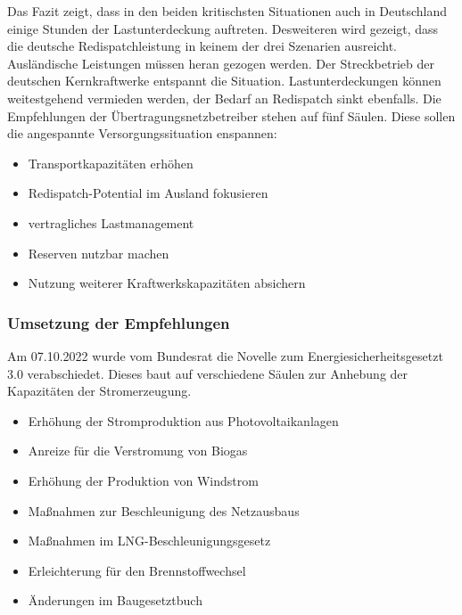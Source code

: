 		Das Fazit zeigt, dass in den beiden kritischsten Situationen auch in Deutschland einige Stunden der Lastunterdeckung auftreten. Desweiteren wird gezeigt, dass die deutsche Redispatchleistung in keinem der drei Szenarien ausreicht. Ausländische Leistungen müssen heran gezogen werden. Der Streckbetrieb der deutschen Kernkraftwerke entspannt die Situation. Lastunterdeckungen können weitestgehend vermieden werden, der Bedarf an Redispatch sinkt ebenfalls. Die Empfehlungen der Übertragungsnetzbetreiber stehen auf fünf Säulen. Diese sollen die angespannte Versorgungssituation enspannen:
			\begin{itemize}
				\item Transportkapazitäten erhöhen
				\item Redispatch-Potential im Ausland fokusieren
				\item vertragliches Lastmanagement
				\item Reserven nutzbar machen
				\item Nutzung weiterer Kraftwerkskapazitäten absichern
			\end{itemize}
		
		\subsubsection{Umsetzung der Empfehlungen} \label{sect: Atomausstieg}
		Am 07.10.2022 wurde vom Bundesrat die Novelle zum Energiesicherheitsgesetzt 3.0 verabschiedet. Dieses baut auf verschiedene Säulen zur Anhebung der Kapazitäten der Stromerzeugung. 
			\begin{itemize}
				\item Erhöhung der Stromproduktion aus Photovoltaikanlagen
				\item Anreize für die Verstromung von Biogas
				\item Erhöhung der Produktion von Windstrom
				\item Maßnahmen zur Beschleunigung des Netzausbaus
				\item Maßnahmen im LNG-Beschleunigungsgesetz
				\item Erleichterung für den Brennstoffwechsel
				\item Änderungen im Baugesetztbuch
			\end{itemize}
		
